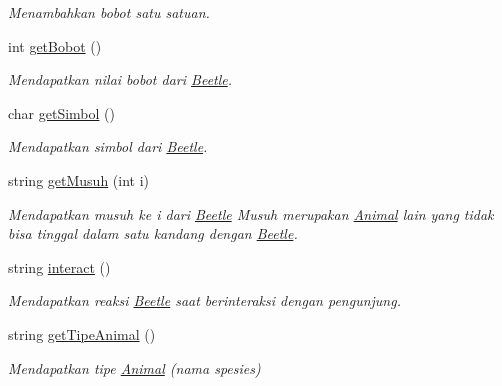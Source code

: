 \begin{DoxyCompactItemize}
\begin{DoxyCompactList}\small\item\em Menambahkan bobot satu satuan. \end{DoxyCompactList}\item 
int \hyperlink{classBeetle_a6c93c4f719178726a355298335923437}{get\-Bobot} ()
\begin{DoxyCompactList}\small\item\em Mendapatkan nilai bobot dari \hyperlink{classBeetle}{Beetle}. \end{DoxyCompactList}\item 
char \hyperlink{classBeetle_a4e47a5dfad4c198a1cc7d4248ca03a35}{get\-Simbol} ()
\begin{DoxyCompactList}\small\item\em Mendapatkan simbol dari \hyperlink{classBeetle}{Beetle}. \end{DoxyCompactList}\item 
string \hyperlink{classBeetle_a3ab31fa3ba09ffdddec91c917bc4779f}{get\-Musuh} (int i)
\begin{DoxyCompactList}\small\item\em Mendapatkan musuh ke i dari \hyperlink{classBeetle}{Beetle} Musuh merupakan \hyperlink{classAnimal}{Animal} lain yang tidak bisa tinggal dalam satu kandang dengan \hyperlink{classBeetle}{Beetle}. \end{DoxyCompactList}\item 
string \hyperlink{classBeetle_a23d1ea3cb62d644a184583f32e6cf102}{interact} ()
\begin{DoxyCompactList}\small\item\em Mendapatkan reaksi \hyperlink{classBeetle}{Beetle} saat berinteraksi dengan pengunjung. \end{DoxyCompactList}\item 
string \hyperlink{classBeetle_a30b538bbf1bf63ca615585bdc512ce33}{get\-Tipe\-Animal} ()
\begin{DoxyCompactList}\small\item\em Mendapatkan tipe \hyperlink{classAnimal}{Animal} (nama spesies) \end{DoxyCompactList}\end{DoxyCompactItemize}
